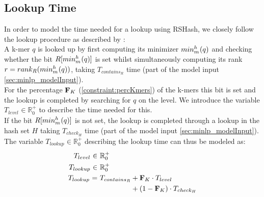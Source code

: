 \documentclass[a4paper,titlepage,onecolumn,oneside,12pt,nenglish,titlepage=firstiscover]{scrbook}
\theoremstyle{plain} %
\theoremstyle{definition} %
\theoremstyle{remark} %
\theoremstyle{plain}
\newcommand{\RR}{\mathbb{R}} %
\newcommand{\kmer}{q}
\newcommand{\contains}{contains}
\newcommand{\rank}{rank}
\newcommand{\timeForOperationOnStructure}[2]{T_{#1_{#2}}} %
\begin{document}
\subsection{Lookup Time}
In order to model the time needed for a lookup using RSHash, we closely follow the lookup procedure as described by \citet{schulte-mattler_rshash_2026}:\\
A k-mer $\kmer$ is looked up by first computing its minimizer $\minimizerOf{\kmer}{}$ and checking whether the bit $R[\minimizerOf{\kmer}{}]$ is set whilst simultaneously computing its rank $r = \rank_R(\minimizerOf{\kmer}{})$, taking $\timeForOperationOnStructure{\contains}{R}$ time (part of the model input \cref{sec:minlp_modelInput}).\\
For the percentage $\textbf{F}_{K}$ (\cref{constraint:percKmers}) of the k-mers this bit is set and the lookup is completed by searching for $\kmer$ on the level. We introduce the variable $\timeForOperationOnStructure{level}{} \in \RR^+_0$ to describe the time needed for this.\\
If the bit $R[\minimizerOf{\kmer}{}]$ is not set, the lookup is completed through a lookup in the hash set $H$ taking $\timeForOperationOnStructure{check}{H}$ time (part of the model input \cref{sec:minlp_modelInput}). The variable $\timeForOperationOnStructure{lookup}{} \in \RR^+_0$ describing the lookup time can thus be modeled as:
\newcommand{\lookupTimeExpression}{
	\nonumber \timeForOperationOnStructure{lookup}{} =&~ \timeForOperationOnStructure{\contains}{R} + \varCDF{K} \cdot \timeForOperationOnStructure{level}{}\\
	&~\phantom{\timeForOperationOnStructure{\contains}{R}}+ (1-\varCDF{K}) \cdot \timeForOperationOnStructure{check}{H}}
\begin{align}
	\timeForOperationOnStructure{level}{} \in&~ \RR^+_0 \label{variable:levelTime}\\
	\timeForOperationOnStructure{lookup}{} \in&~ \RR^+_0 \label{variable:lookupTime}\\
	\lookupTimeExpression \label{constraint:lookupTime}
\end{align}
\end{document}
